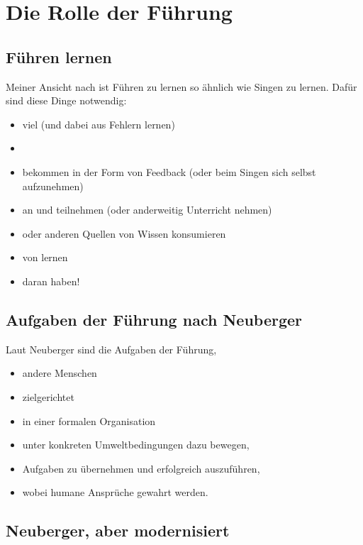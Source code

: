 \section{Die Rolle der Führung}
\label{fuehrung-rolle}


\subsection{Führen lernen}

Meiner Ansicht nach ist Führen zu lernen so ähnlich wie Singen zu lernen. Dafür sind diese Dinge notwendig:

\begin{itemize}
  \item viel  (und dabei aus Fehlern lernen)
  \item {}
  \item {} bekommen in der Form von Feedback (oder beim Singen sich selbst aufzunehmen)
  \item an  und  teilnehmen (oder anderweitig Unterricht nehmen)
  \item {} oder anderen Quellen von Wissen konsumieren
  \item von  lernen
  \item {} daran haben!
\end{itemize}


\subsection{Aufgaben der Führung nach Neuberger}

Laut Neuberger\cite{neuberger-fuehren} sind die Aufgaben der Führung,

\begin{itemize}
  \item andere Menschen
  \item zielgerichtet
  \item in einer formalen Organisation
  \item unter konkreten Umweltbedingungen dazu bewegen,
  \item Aufgaben zu übernehmen und erfolgreich auszuführen,
  \item wobei humane Ansprüche gewahrt werden.
\end{itemize}


\subsection{Neuberger, aber modernisiert}

